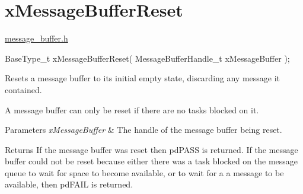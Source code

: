 \hypertarget{group__x_message_buffer_reset}{}\section{x\+Message\+Buffer\+Reset}
\label{group__x_message_buffer_reset}
\mbox{\hyperlink{message__buffer_8h_source}{message\+\_\+buffer.\+h}} 
\begin{DoxyPre}
BaseType\_t xMessageBufferReset( MessageBufferHandle\_t xMessageBuffer );
\end{DoxyPre}


Resets a message buffer to its initial empty state, discarding any message it contained.

A message buffer can only be reset if there are no tasks blocked on it.


\begin{DoxyParams}{Parameters}
{\em x\+Message\+Buffer} & The handle of the message buffer being reset.\\
\hline
\end{DoxyParams}
\begin{DoxyReturn}{Returns}
If the message buffer was reset then pd\+P\+A\+SS is returned. If the message buffer could not be reset because either there was a task blocked on the message queue to wait for space to become available, or to wait for a a message to be available, then pd\+F\+A\+IL is returned. 
\end{DoxyReturn}
